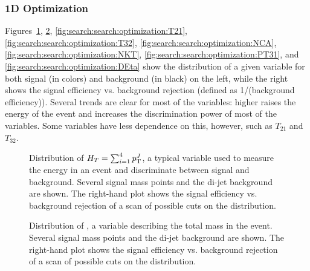 \subsubsection{1D Optimization}

Figures~\ref{fig:search:search:optimization:HT}, \ref{fig:search:search:optimization:MJ}, \ref{fig:search:search:optimization:T21}, \ref{fig:search:search:optimization:T32}, \ref{fig:search:search:optimization:NCA}, \ref{fig:search:search:optimization:NKT}, \ref{fig:search:search:optimization:PT31}, and \ref{fig:search:search:optimization:DEta} show the distribution of a given variable for both signal (in colors) and background (in black) on the left, while the right shows the signal efficiency vs. background rejection (defined as 1/(background efficiency)). Several trends are clear for most of the variables: higher \mgluino raises the energy of the event and increases the discrimination power of most of the variables. Some variables have less dependence on this, however, such as $T_{21}$ and $T_{32}$.


\begin{figure}
\centering
{}
\label{fig:search:search:optimization:HT}
\caption{Distribution of $H_T = \sum_{i=1}^4 p_{\text{T}}^J$, a typical variable used to measure the energy in an event and discriminate between signal and background. Several signal mass points and the \herwigpp di-jet background are shown. The right-hand plot shows the signal efficiency vs. background rejection of a scan of possible cuts on the \HT distribution.}
\end{figure}




\begin{figure}
\centering
{}
\label{fig:search:search:optimization:MJ}
\caption{Distribution of \MJ, a variable describing the total mass in the event. Several signal mass points and the \herwigpp di-jet background are shown. The right-hand plot shows the signal efficiency vs. background rejection of a scan of possible cuts on the \MJ distribution.}
\end{figure}

